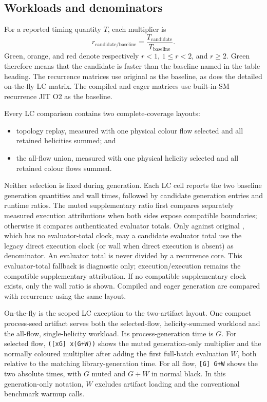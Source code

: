 

\subsection*{Workloads and denominators}

For a reported timing quantity \(T\), each multiplier is
\begin{equation}
  r_{\mathrm{candidate/baseline}}
  = \frac{T_{\mathrm{candidate}}}{T_{\mathrm{baseline}}}.
  \label{eq:three-mode-matrix-time-ratio}
\end{equation}
Green, orange, and red denote respectively \(r<1\), \(1\leq r<2\), and
\(r\geq2\).  Green therefore means that the candidate is faster than the
baseline named in the table heading.  The recurrence matrices use original
\AC{} as the baseline, as does the detailed on-the-fly LC matrix. The compiled
and eager matrices use built-in-SM recurrence JIT O2 as the baseline.

Every LC comparison contains two complete-coverage layouts:
\begin{itemize}
  \item topology replay, measured with one physical colour flow selected and
        all retained helicities summed; and
  \item the all-flow union, measured with one physical helicity selected and
        all retained colour flows summed.
\end{itemize}
Neither selection is fixed during generation. Each LC cell reports the two
baseline generation quantities and wall times, followed by candidate
generation entries and runtime ratios. The muted supplementary ratio first
compares separately measured execution attributions when both sides expose
compatible boundaries; otherwise it compares authenticated evaluator totals.
Only against original \AC{}, which has no evaluator-total clock, may a candidate
evaluator total use the legacy direct execution clock (or wall when direct
execution is absent) as denominator. An evaluator total is never divided by a
recurrence core. This evaluator-total fallback is diagnostic only;
execution/execution remains the compatible supplementary attribution. If no
compatible supplementary clock exists, only the wall ratio is shown. Compiled
and eager generation are compared with recurrence using the same layout.

On-the-fly is the scoped LC exception to the two-artifact layout. One compact
process-seed artifact serves both the selected-flow, helicity-summed
workload and the all-flow, single-helicity workload. Its process-generation
time is \(G\). For selected flow, \texttt{([xG] x(G+W))} shows the muted
generation-only multiplier and the normally coloured multiplier after adding
the first full-batch evaluation \(W\), both relative to the matching \AC{}
library-generation time. For all flow, \texttt{[G] G+W} shows the two absolute
times, with \(G\) muted and \(G+W\) in normal black. In this generation-only
notation, \(W\) excludes artifact loading and the conventional benchmark
warmup calls.

